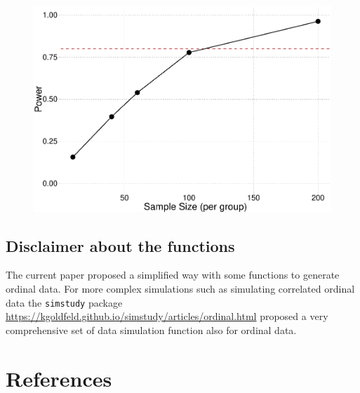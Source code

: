 \documentclass[
  man,floatsintext]{apa6}
\begin{document}
\begin{figure}

{\centering \includegraphics{paper-new_files/figure-latex/unnamed-chunk-28-1} 

}

\caption{ }\label{fig:unnamed-chunk-28}
\end{figure}

\normalsize

\subsection{Disclaimer about the functions}\label{disclaimer-about-the-functions}

The current paper proposed a simplified way with some functions to generate ordinal data. For more complex simulations such as simulating correlated ordinal data the \texttt{simstudy} package \url{https://kgoldfeld.github.io/simstudy/articles/ordinal.html} proposed a very comprehensive set of data simulation function also for ordinal data.

\newpage

\section{References}\label{references}
\end{document}
